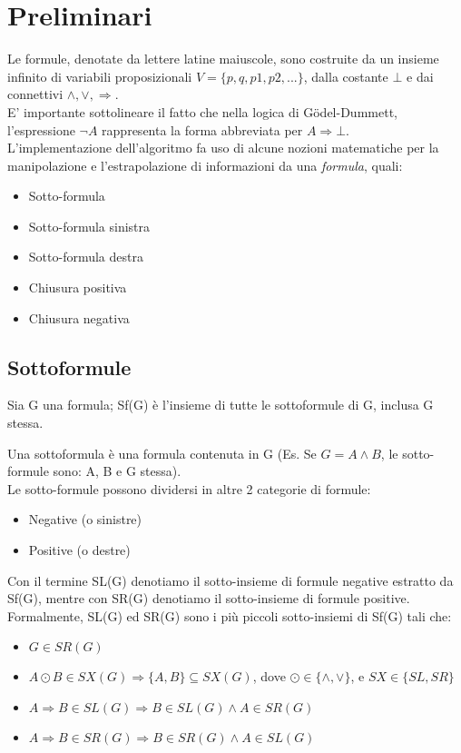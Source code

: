 \documentclass[\main/tesi.tex]{subfiles}
\begin{document}
\chapter{Preliminari}

Le formule, denotate da lettere latine maiuscole, sono costruite da un insieme infinito di variabili proposizionali \(V = \{p,q,p1,p2,...\}\), dalla costante \(\bot\) e dai connettivi \(\land, \lor, \Rightarrow\). \\
E' importante sottolineare il fatto che nella logica di G\"odel-Dummett, l'espressione \(\neg A\) rappresenta la forma abbreviata per \(A \Rightarrow \bot\). \\

L'implementazione dell'algoritmo fa uso di alcune nozioni matematiche per la manipolazione e l'estrapolazione di informazioni da una \textit{formula}, quali: \\
\begin{itemize}
    \item Sotto-formula
    \item Sotto-formula sinistra
    \item Sotto-formula destra
    \item Chiusura positiva
    \item Chiusura negativa
\end{itemize}

\newpage

\section{Sottoformule}

Sia G una formula; Sf(G) è l'insieme di tutte le sottoformule di G, inclusa G stessa.

Una sottoformula è una formula contenuta in G (Es. Se \(G = A \land B\), le sotto-formule sono: A, B e G stessa). \\
Le sotto-formule possono dividersi in altre 2 categorie di formule:
\begin{itemize}
    \item Negative (o sinistre)
    \item Positive (o destre)
\end{itemize}

Con il termine SL(G) denotiamo il sotto-insieme di formule negative estratto da Sf(G), mentre con SR(G) denotiamo il sotto-insieme di formule positive. \\
Formalmente, SL(G) ed SR(G) sono i più piccoli sotto-insiemi di Sf(G) tali che:
\begin{itemize}
    \item \(G \in SR(G)\)
    \item \(A \odot B \in SX(G) \Rightarrow \{A, B\} \subseteq SX(G)\), dove \(\odot \in \{\land, \lor\}\), e \(SX \in \{SL, SR\}\)
    \item \(A \Rightarrow B \in SL(G) \Rightarrow B \in SL(G) \land A \in SR(G)\)
    \item \(A \Rightarrow B \in SR(G) \Rightarrow B \in SR(G) \land A \in SL(G)\)
\end{itemize}
\end{document}
